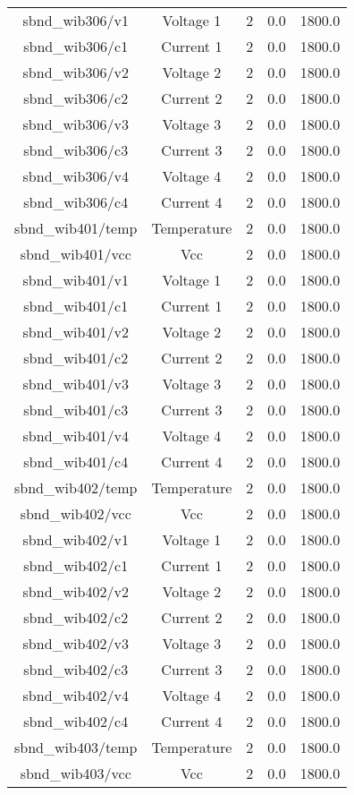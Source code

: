 \begin{table}[ptb]
\begin{tabular}{c | c c c c}
sbnd_wib306/v1 & Voltage 1 & 2 & 0.0 & 1800.0\\ 
sbnd_wib306/c1 & Current 1 & 2 & 0.0 & 1800.0\\ 
sbnd_wib306/v2 & Voltage 2 & 2 & 0.0 & 1800.0\\ 
sbnd_wib306/c2 & Current 2 & 2 & 0.0 & 1800.0\\ 
sbnd_wib306/v3 & Voltage 3 & 2 & 0.0 & 1800.0\\ 
sbnd_wib306/c3 & Current 3 & 2 & 0.0 & 1800.0\\ 
sbnd_wib306/v4 & Voltage 4 & 2 & 0.0 & 1800.0\\ 
sbnd_wib306/c4 & Current 4 & 2 & 0.0 & 1800.0\\ 
sbnd_wib401/temp & Temperature & 2 & 0.0 & 1800.0\\ 
sbnd_wib401/vcc & Vcc & 2 & 0.0 & 1800.0\\ 
sbnd_wib401/v1 & Voltage 1 & 2 & 0.0 & 1800.0\\ 
sbnd_wib401/c1 & Current 1 & 2 & 0.0 & 1800.0\\ 
sbnd_wib401/v2 & Voltage 2 & 2 & 0.0 & 1800.0\\ 
sbnd_wib401/c2 & Current 2 & 2 & 0.0 & 1800.0\\ 
sbnd_wib401/v3 & Voltage 3 & 2 & 0.0 & 1800.0\\ 
sbnd_wib401/c3 & Current 3 & 2 & 0.0 & 1800.0\\ 
sbnd_wib401/v4 & Voltage 4 & 2 & 0.0 & 1800.0\\ 
sbnd_wib401/c4 & Current 4 & 2 & 0.0 & 1800.0\\ 
sbnd_wib402/temp & Temperature & 2 & 0.0 & 1800.0\\ 
sbnd_wib402/vcc & Vcc & 2 & 0.0 & 1800.0\\ 
sbnd_wib402/v1 & Voltage 1 & 2 & 0.0 & 1800.0\\ 
sbnd_wib402/c1 & Current 1 & 2 & 0.0 & 1800.0\\ 
sbnd_wib402/v2 & Voltage 2 & 2 & 0.0 & 1800.0\\ 
sbnd_wib402/c2 & Current 2 & 2 & 0.0 & 1800.0\\ 
sbnd_wib402/v3 & Voltage 3 & 2 & 0.0 & 1800.0\\ 
sbnd_wib402/c3 & Current 3 & 2 & 0.0 & 1800.0\\ 
sbnd_wib402/v4 & Voltage 4 & 2 & 0.0 & 1800.0\\ 
sbnd_wib402/c4 & Current 4 & 2 & 0.0 & 1800.0\\ 
sbnd_wib403/temp & Temperature & 2 & 0.0 & 1800.0\\ 
sbnd_wib403/vcc & Vcc & 2 & 0.0 & 1800.0\\ 

\end{tabular}
\end{table}
